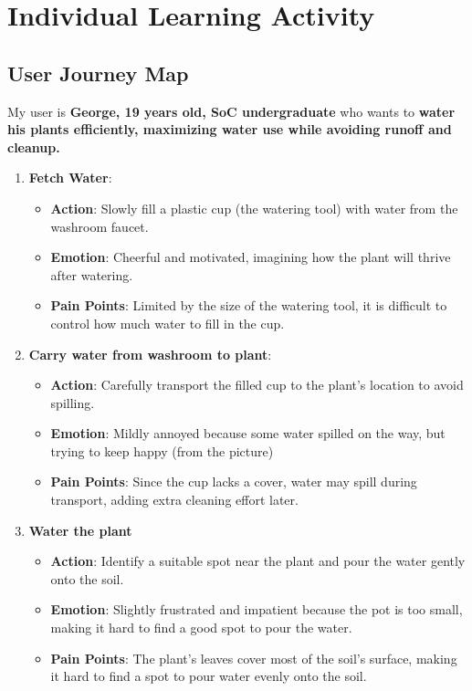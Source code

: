 \documentclass[math,code]{amznotes}
\theoremstyle{remark}
\begin{document}
\section{Individual Learning Activity}
\subsection{User Journey Map}
My user is \textbf{George, 19 years old, SoC undergraduate} who wants to \textbf{water his plants efficiently, maximizing water use while avoiding runoff and cleanup.}
\begin{enumerate}
    \item \textbf{Fetch Water}:
    \begin{itemize}
        \item \textbf{Action}: Slowly fill a plastic cup (the watering tool) with water from the washroom faucet.
        \item \textbf{Emotion}: Cheerful and motivated, imagining how the plant will thrive after watering.
        \item \textbf{Pain Points}: Limited by the size of the watering tool, it is difficult to control how much water to fill in the cup.
    \end{itemize}
    \item \textbf{Carry water from washroom to plant}:
    \begin{itemize}
        \item \textbf{Action}: Carefully transport the filled cup to the plant’s location to avoid spilling.
        \item \textbf{Emotion}: Mildly annoyed because some water spilled on the way, but trying to keep happy (from the picture)
        \item \textbf{Pain Points}: Since the cup lacks a cover, water may spill during transport, adding extra cleaning effort later.
    \end{itemize}
    \item \textbf{Water the plant}
    \begin{itemize}
        \item \textbf{Action}: Identify a suitable spot near the plant and pour the water gently onto the soil.
        \item \textbf{Emotion}: Slightly frustrated and impatient because the pot is too small, making it hard to find a good spot to pour the water.
        \item \textbf{Pain Points}: The plant's leaves cover most of the soil's surface, making it hard to find a spot to pour water evenly onto the soil.

\end{itemize}
\end{enumerate}
\end{document}
